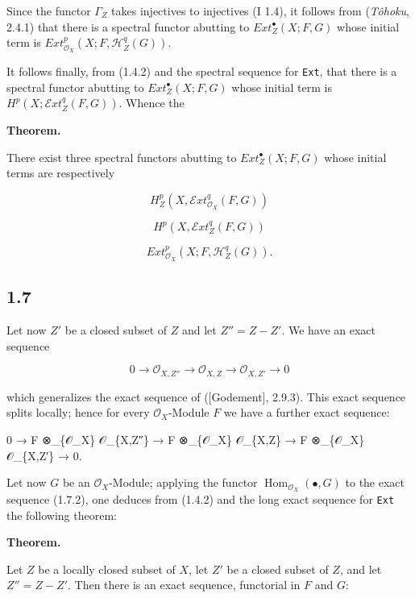 \documentclass[
  11pt,
  a4paper,
]{book}
\newenvironment{Shaded}{}{}
\newcommand{\NormalTok}[1]{#1}
\begin{document}
Since the functor \(\Gamma_{Z}\) takes injectives to injectives (I 1.4),
it follows from (\emph{Tôhoku}, 2.4.1) that there is a spectral functor
abutting to \(Ext^{\bullet}_{Z}(X; F, G)\) whose initial term is
\(Ext^{p}_{\mathcal{O}_{X}}(X; F,
\mathcal{H}^{q}_{Z}(G))\).

It follows finally, from (1.4.2) and the spectral sequence for
\texttt{Ext}, that there is a spectral functor abutting to
\(Ext^{\bullet}_{Z}(X; F, G)\) whose initial term is
\(H^{p}(X; \mathcal{E}xt^{q}_{Z}(F, G))\). Whence the

\textbf{Theorem.}

There exist three spectral functors abutting to
\(Ext^{\bullet}_{Z}(X; F, G)\) whose initial terms are respectively

\[ H^{p}_{Z}(X, \mathcal{E}xt^{q}_{\mathcal{O}_{X}}(F, G)) \]

\[ H^{p}(X, \mathcal{E}xt^{q}_{Z}(F, G)) \]

\[ Ext^{p}_{\mathcal{O}_{X}}(X; F, \mathcal{H}^{q}_{Z}(G)). \]

\subsection{1.7}\label{section-3}

Let now \(Z'\) be a closed subset of \(Z\) and let \(Z'' = Z - Z'\). We
have an exact sequence

\[ 0 \to \mathcal{O}_{X,Z''} \to \mathcal{O}_{X,Z} \to \mathcal{O}_{X,Z'} \to 0 \]

which generalizes the exact sequence of ({[}Godement{]}, 2.9.3). This
exact sequence splits locally; hence for every
\(\mathcal{O}_{X}\)-Module \(F\) we have a further exact sequence:

\begin{Shaded}
\begin{Highlighting}[]
\NormalTok{0 → F ⊗\_\{𝒪\_X\} 𝒪\_\{X,Z″\} → F ⊗\_\{𝒪\_X\} 𝒪\_\{X,Z\} → F ⊗\_\{𝒪\_X\} 𝒪\_\{X,Z′\} → 0.}
\end{Highlighting}
\end{Shaded}

Let now \(G\) be an \(\mathcal{O}_{X}\)-Module; applying the functor
\(\operatorname{Hom}_{\mathcal{O}_{X}}(\bullet, G)\) to the exact
sequence (1.7.2), one deduces from (1.4.2) and the long exact sequence
for \texttt{Ext} the following theorem:

\textbf{Theorem.}

Let \(Z\) be a locally closed subset of \(X\), let \(Z'\) be a closed
subset of \(Z\), and let \(Z'' = Z - Z'\). Then there is an exact
sequence, functorial in \(F\) and \(G\):
\end{document}
